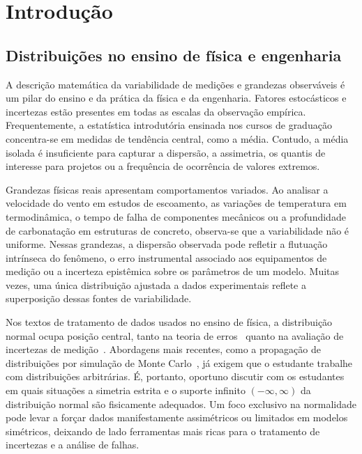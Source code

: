 \section{Introdução}\label{sec:introducao}

\subsection{Distribuições no ensino de física e engenharia}

A descrição matemática da variabilidade de medições e grandezas observáveis é um pilar do ensino e da prática da física e da engenharia. Fatores estocásticos e incertezas estão presentes em todas as escalas da observação empírica. Frequentemente, a estatística introdutória ensinada nos cursos de graduação concentra-se em medidas de tendência central, como a média. Contudo, a média isolada é insuficiente para capturar a dispersão, a assimetria, os quantis de interesse para projetos ou a frequência de ocorrência de valores extremos.

Grandezas físicas reais apresentam comportamentos variados. Ao analisar a velocidade do vento em estudos de escoamento, as variações de temperatura em termodinâmica, o tempo de falha de componentes mecânicos ou a profundidade de carbonatação em estruturas de concreto, observa-se que a variabilidade não é uniforme. Nessas grandezas, a dispersão observada pode refletir a flutuação intrínseca do fenômeno, o erro instrumental associado aos equipamentos de medição ou a incerteza epistêmica sobre os parâmetros de um modelo. Muitas vezes, uma única distribuição ajustada a dados experimentais reflete a superposição dessas fontes de variabilidade.

Nos textos de tratamento de dados usados no ensino de física, a distribuição normal ocupa posição central, tanto na teoria de erros~\cite{vuolo1996} quanto na avaliação de incertezas de medição~\cite{gum2008}. Abordagens mais recentes, como a propagação de distribuições por simulação de Monte Carlo~\cite{gums1,ribeiro2025}, já exigem que o estudante trabalhe com distribuições arbitrárias. É, portanto, oportuno discutir com os estudantes em quais situações a simetria estrita e o suporte infinito $(-\infty, \infty)$ da distribuição normal são fisicamente adequados. Um foco exclusivo na normalidade pode levar a forçar dados manifestamente assimétricos ou limitados em modelos simétricos, deixando de lado ferramentas mais ricas para o tratamento de incertezas e a análise de falhas.

